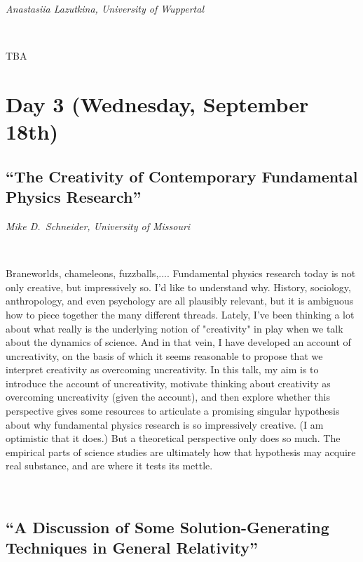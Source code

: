 \documentclass[11pt]{article}
\begin{document}
\textcolor{moderncvgreen}{
\textit{Anastasiia
Lazutkina, University of Wuppertal
}
}

\

TBA

\newpage 

\section*{\textsf{Day 3 (Wednesday, September 18th)}}
\vspace{3em}

\subsection*{\textsf{``The Creativity of Contemporary
Fundamental Physics Research''}}

\textcolor{moderncvgreen}{
\textit{Mike D.~Schneider, University of Missouri
}
}

\

Braneworlds, chameleons, fuzzballs,.... Fundamental physics research today is not only creative, but impressively so. I'd like to understand why. History, sociology, anthropology, and even psychology are all plausibly relevant, but it is ambiguous how to piece together the many different threads. Lately, I've been thinking a lot about what really is the underlying notion of "creativity" in play when we talk about the dynamics of science. And in that vein, I have developed an account of uncreativity, on the basis of which it seems reasonable to propose that we interpret creativity as overcoming uncreativity. In this talk, my aim is to introduce the account of uncreativity, motivate thinking about creativity as overcoming uncreativity (given the account), and then explore whether this perspective gives some resources to articulate a promising singular hypothesis about why fundamental physics research is so impressively creative. (I am optimistic that it does.) But a theoretical perspective only does so much. The empirical parts of science studies are ultimately how that hypothesis may acquire real substance, and are where it tests its mettle. 

\ 

\subsection*{\textsf{``A Discussion of Some
Solution-Generating Techniques in
General Relativity''}}
\end{document}
